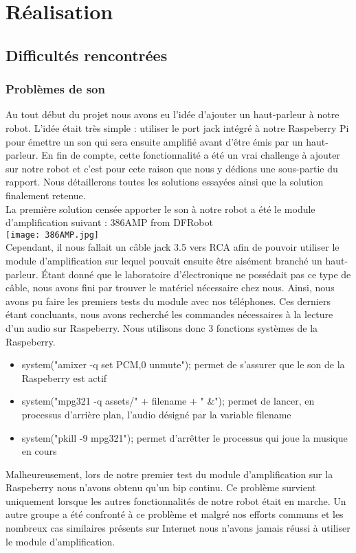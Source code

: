 
\chapter{Réalisation}
\lipsum[7-8]
\section{Difficultés rencontrées}
\subsection{Problèmes de son}
Au tout début du projet nous avons eu l'idée d'ajouter un haut-parleur à notre robot. L'idée était très simple : utiliser le port jack intégré à notre Raspeberry Pi pour émettre un son qui sera ensuite amplifié avant d'être émis par un haut-parleur. En fin de compte, cette fonctionnalité a été un vrai challenge à ajouter sur notre robot et c'est pour cete raison que nous y dédions une sous-partie du rapport. Nous détaillerons toutes les solutions essayées ainsi que la solution finalement retenue.
\\
La première solution censée apporter le son à notre robot a été le module d'amplification suivant : 386AMP from DFRobot
\\
\texttt{[image: 386AMP.jpg]}
\\
Cependant, il nous fallait un câble jack 3.5 vers RCA afin de pouvoir utiliser le module d'amplification sur lequel pouvait ensuite être aisément branché un haut-parleur. Étant donné que le laboratoire d'électronique ne possédait pas ce type de câble, nous avons fini par trouver le matériel nécessaire chez nous. Ainsi, nous avons pu faire les premiers tests du module avec nos téléphones. Ces derniers étant concluants, nous avons recherché les commandes nécessaires à la lecture d'un audio sur Raspeberry. Nous utilisons donc 3 fonctions systèmes
de la Raspeberry.
\begin{itemize}
    \item system("amixer -q set PCM,0 unmute"); permet de s'assurer que le son de la Raspeberry est actif
    \item system("mpg321 -q assets/" + filename + " \&"); permet de lancer, en processus d'arrière plan, l'audio désigné par la variable filename
    \item system("pkill -9 mpg321"); permet d'arrêtter le processus qui joue la musique en cours
\end{itemize}
Malheureusement, lors de notre premier test du module d'amplification sur la Raspeberry nous n'avons obtenu qu'un bip continu. Ce problème survient uniquement lorsque les autres fonctionnalités  de notre robot était en marche. Un autre groupe a été confronté à ce problème et malgré nos efforts communs et les nombreux cas similaires présents sur Internet nous n'avons jamais réussi à utiliser le module d'amplification.
